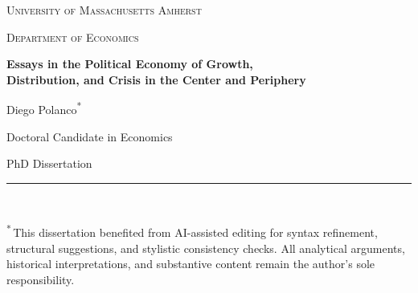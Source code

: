 %

\begin{titlepage}
\begin{center}
\vspace*{2cm}

{\large\scshape University of Massachusetts Amherst}

\vspace{0.6cm}

{\large\scshape Department of Economics}

\vspace{2.5cm}

{\LARGE\bfseries Essays in the Political Economy of Growth,\\[0.4em]
Distribution, and Crisis in the Center and Periphery}

\vspace{0.6cm}

\vspace{3cm}

{\large Diego Polanco\textsuperscript{*}}

\vspace{0.4cm}

{\normalsize Doctoral Candidate in Economics}

\vspace{2.5cm}

{\normalsize PhD Dissertation}

\vspace{0.6cm}

{\normalsize\the\year}

\vfill

\parbox{\linewidth}{%
  \noindent\rule{0.28\linewidth}{0.4pt}\\[0.4em]
  {\footnotesize\noindent\textsuperscript{*}\,This dissertation benefited from AI-assisted editing for syntax refinement, structural suggestions, and stylistic consistency checks. All analytical arguments, historical interpretations, and substantive content remain the author's sole responsibility.\par}%
}

\end{center}
\end{titlepage}

